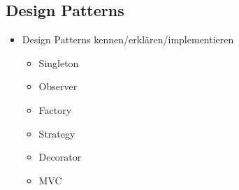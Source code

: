 \subsection{Design Patterns}
\label{sec:DesignPatterns}

\begin{itemize}
	\item Design Patterns kennen/erklären/implementieren
	\begin{itemize}
		\item Singleton
		\item Observer
		\item Factory
		\item Strategy
		\item Decorator
		\item MVC
	\end{itemize}
\end{itemize}